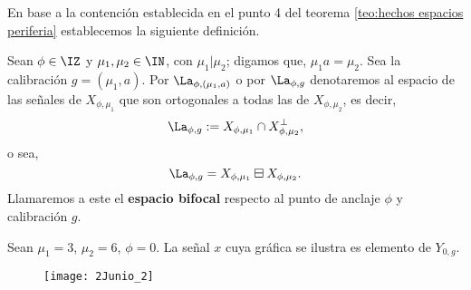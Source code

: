 En base a la contención establecida en el punto 4 
del teorema \ref{teo:hechos espacios periferia}
establecemos la siguiente definición.
\begin{defi}
\label{def: espacios Y}
Sean $\phi \in \IZ$ y $\mu_{1}, \mu_{2} \in \IN$, con $\mu_{1} | \mu_{2} $;
digamos que, $\mu_{1}a = \mu_{2}$. Sea la calibración
$g=(\mu_{1}, a)$.
Por $\La_{\phi,(\mu_{1}, a)}$ o por $\La_{\phi, g}$ 
denotaremos al espacio de las señales de $X_{\phi, \mu_{1}}$ que
son ortogonales a todas las de $X_{\phi, \mu_{2}}$, es decir,
\[
\La_{\phi, g} := X_{\phi , \mu_{1}} \cap  X_{\phi, \mu_{2}}^{\perp},
\]
o sea,
\[
\La_{\phi, g} = X_{\phi, \mu_{1}} \boxminus  X_{\phi, \mu_{2}}.
\]
Llamaremos a este el \textbf{espacio bifocal} respecto al punto
de anclaje $\phi$ y calibración $g$.
\end{defi}

\begin{ej}
Sean  $\mu_{1}=3$, $\mu_{2}=6$, $\phi=0$. La señal $x$ cuya gráfica 
se ilustra es elemento de $Y_{0,g}$.
\begin{figure}[H]
	\centering
	\texttt{[image: 2Junio\_2]}
\end{figure}
\end{ej}

